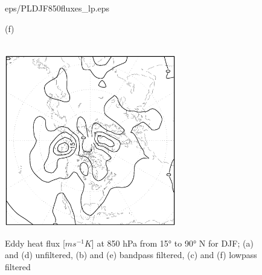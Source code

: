 \documentclass[12pt,a4paper,twoside,openright,headinclude,liststotoc,bibtotoc]{scrreprt}
\begin{document}
\begin{figure}[b]
{{eps/PLDJF850fluxes_lp.eps}
}
\parbox{8.5cm}{\hspace{0.95cm}\begin{scriptsize}(f)\end{scriptsize} \vspace{-0.2cm} \\
\includegraphics[height=7.5cm,angle=-90]
{eps/ERADJF850fluxes_lp.eps}
}
\caption[Eddy heat flux at 850 hPa for DJF and JJA]{Eddy heat flux [$ms^{-1}K$] at 850 hPa from 15° to 90° N for DJF; (a) and (d) unfiltered, (b) and (e) bandpass filtered, (c) and (f) lowpass filtered}
\label{img:vT850DJF}
\end{figure}
\end{document}
